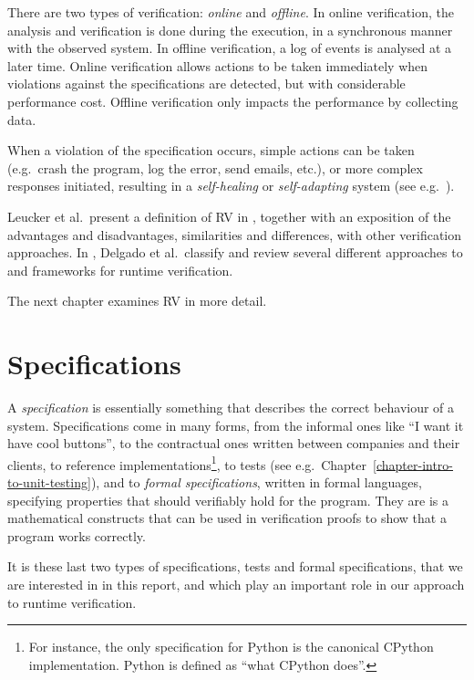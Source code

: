 \documentclass[a4paper,11pt]{kth-mag}
\theoremstyle{definition}
\begin{document}
There are two types of verification: \emph{online} and \emph{offline}. In
online verification, the analysis and verification is done during the
execution, in a synchronous manner with the observed system. In offline
verification, a log of events is analysed at a later time. Online verification
allows actions to be taken immediately when violations against the
specifications are detected, but with considerable performance cost. Offline
verification only impacts the performance by collecting data.

When a violation of the specification occurs, simple actions can be taken
(e.g.\ crash the program, log the error, send emails, etc.), or more complex
responses initiated, resulting in a \textit{self-healing} or
\textit{self-adapting} system (see e.g.\ \cite{huebscher08survey}).

Leucker et al.\ present a definition of RV in \cite{leucker09abriefaccount},
together with an exposition of the advantages and disadvantages, similarities
and differences, with other verification approaches. In
\cite{delgado04taxonomy}, Delgado et al.\ classify and review several different
approaches to and frameworks for runtime verification.

The next chapter examines RV in more detail.


\section{Specifications} \label{section-specifications}

A \textit{specification} is essentially something that describes the correct
behaviour of a system. Specifications come in many forms, from the informal
ones like ``I want it have cool buttons'', to the contractual ones written
between companies and their clients, to reference implementations\footnote{For
instance, the only specification for Python is the canonical CPython
implementation. Python is defined as ``what CPython does''.}, to tests (see
e.g.\ Chapter~\ref{chapter-intro-to-unit-testing}), and to \textit{formal
specifications}, written in formal languages, specifying properties that should
verifiably hold for the program. They are is a mathematical constructs that can
be used in verification proofs to show that a program works correctly.

It is these last two types of specifications, tests and formal specifications,
that we are interested in in this report, and which play an important role in
our approach to runtime verification.
\end{document}
